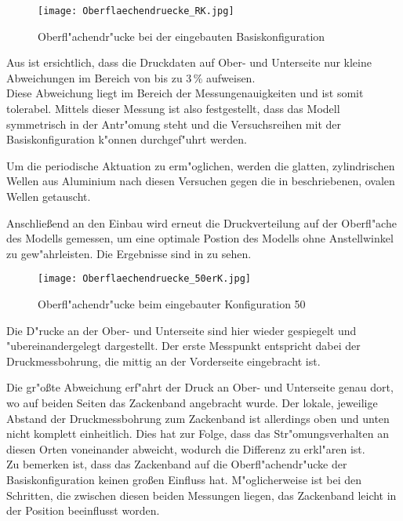 \begin{figure}[h]
	\centering
	\texttt{[image: Oberflaechendruecke\_RK.jpg]}
	\caption{Oberfl"achendr"ucke bei der eingebauten Basiskonfiguration}
	\label{fig:Oberflaechendruckverteilung RK}
\end{figure}

Aus  ist ersichtlich, dass die Druckdaten auf Ober- und Unterseite nur kleine Abweichungen im Bereich von bis zu 3\,\% aufweisen.\\
Diese Abweichung liegt im Bereich der Messungenauigkeiten und ist somit tolerabel.
Mittels dieser Messung ist also festgestellt, dass das Modell symmetrisch in der Antr"omung steht und die Versuchsreihen mit der Basiskonfiguration k"onnen durchgef"uhrt werden.

Um die periodische Aktuation zu erm"oglichen, werden die glatten, zylindrischen Wellen aus Aluminium nach diesen Versuchen gegen die in  beschriebenen, ovalen Wellen getauscht.

Anschlie\ss{}end an den Einbau wird erneut die Druckverteilung auf der Oberfl"ache des Modells gemessen, um eine optimale Postion des Modells ohne Anstellwinkel zu gew"ahrleisten. Die Ergebnisse sind in 
zu sehen.

	\begin{figure}[h]
	\centering
	\texttt{[image: Oberflaechendruecke\_50erK.jpg]}
	\caption{Oberfl"achendr"ucke beim eingebauter Konfiguration 50}
	\label{fig:Oberflaechendruckverteilung 50}
	\end{figure}

Die D"rucke an der Ober- und Unterseite sind hier wieder gespiegelt und "ubereinandergelegt dargestellt. Der erste Messpunkt entspricht dabei der Druckmessbohrung, die mittig an der Vorderseite eingebracht ist.

Die gr"o\ss{}te Abweichung erf"ahrt der Druck an Ober- und Unterseite genau dort, wo auf beiden Seiten das Zackenband angebracht wurde. Der lokale, jeweilige Abstand der Druckmessbohrung zum Zackenband ist allerdings oben und unten nicht komplett einheitlich. Dies hat zur Folge, dass das Str"omungsverhalten an diesen Orten voneinander abweicht, wodurch die Differenz zu erkl"aren ist.\\
Zu bemerken ist, dass das Zackenband auf die Oberfl"achendr"ucke der Basiskonfiguration keinen gro\ss{}en Einfluss hat. M"oglicherweise ist bei den Schritten, die zwischen diesen beiden Messungen liegen, das Zackenband leicht in der Position beeinflusst worden.

